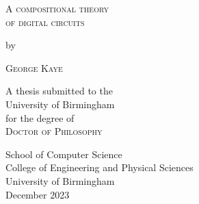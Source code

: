 \begin{titlepage}
\begin{center}

  \large %

  {\Huge\textsc{A compositional theory\\of digital circuits}\par}


  by


  {\huge\textsc{George Kaye}}


  A thesis submitted to the \\
  University of Birmingham \\
  for the degree of \\
  \textsc{Doctor of Philosophy}

  \vfill

  \flushright
  School of Computer Science \\
  College of Engineering and Physical Sciences \\
  University of Birmingham \\
  December 2023

\end{center}
\end{titlepage}